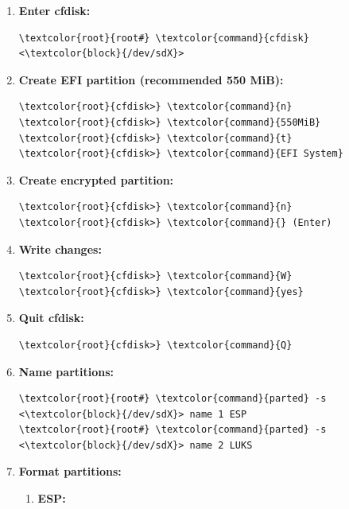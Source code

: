 \documentclass[10pt, a4paper, onecolumn, oneside, titlepage, openany]{book}
\begin{document}
\begin{enumerate}
    \item \textbf{Enter cfdisk:}
\begin{Verbatim}[commandchars=\\\{\}]
\textcolor{root}{root#} \textcolor{command}{cfdisk} <\textcolor{block}{/dev/sdX}>
\end{Verbatim}
    \item \textbf{Create EFI partition (recommended 550 MiB):}
\begin{Verbatim}[commandchars=\\\{\}]
\textcolor{root}{cfdisk>} \textcolor{command}{n}
\textcolor{root}{cfdisk>} \textcolor{command}{550MiB}
\textcolor{root}{cfdisk>} \textcolor{command}{t}
\textcolor{root}{cfdisk>} \textcolor{command}{EFI System}
\end{Verbatim}
    \item \textbf{Create encrypted partition:}
\begin{Verbatim}[commandchars=\\\{\}]
\textcolor{root}{cfdisk>} \textcolor{command}{n}
\textcolor{root}{cfdisk>} \textcolor{command}{} (Enter)
\end{Verbatim}
    \item \textbf{Write changes:}
\begin{Verbatim}[commandchars=\\\{\}]
\textcolor{root}{cfdisk>} \textcolor{command}{W}
\textcolor{root}{cfdisk>} \textcolor{command}{yes}
\end{Verbatim}
    \item \textbf{Quit cfdisk:}
\begin{Verbatim}[commandchars=\\\{\}]
\textcolor{root}{cfdisk>} \textcolor{command}{Q}
\end{Verbatim}
    \item \textbf{Name partitions:}
\begin{Verbatim}[commandchars=\\\{\}]
\textcolor{root}{root#} \textcolor{command}{parted} -s <\textcolor{block}{/dev/sdX}> name 1 ESP
\textcolor{root}{root#} \textcolor{command}{parted} -s <\textcolor{block}{/dev/sdX}> name 2 LUKS
\end{Verbatim}
    \item \textbf{Format partitions:}
    \begin{enumerate}
        \item \textbf{ESP:}
\begin{Verbatim}[commandchars=\\\{\}]

\end{Verbatim}
\end{enumerate}
\end{enumerate}
\end{document}
